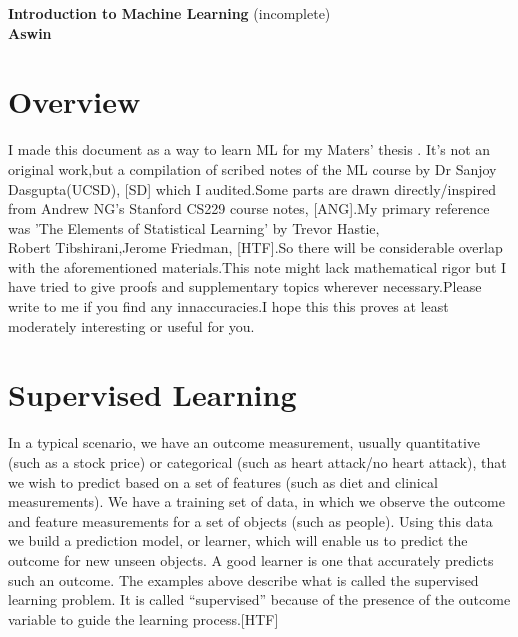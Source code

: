 \documentclass[12pt]{article}
\begin{document}
	
		\enlargethispage{2cm}
		
		\begin{center}
			
			\vspace*{-1cm}
			
			\textbf{\Large Introduction to Machine Learning     }(incomplete)\\[10pt]
			

\textbf{\Large Aswin}\\ [8pt]			
			
			\end{center}
		
\cleardoublepage

\section*{Overview}

I made this document as a way to learn ML for my Maters' thesis . It’s not an original work,but a compilation of scribed notes of the ML course by Dr Sanjoy Dasgupta(UCSD), [SD] which I audited.Some parts are drawn directly/inspired from Andrew NG's Stanford CS229 course notes, [ANG].My primary reference was 'The Elements of Statistical Learning' by Trevor Hastie,\\Robert Tibshirani,Jerome Friedman, [HTF].So there will be considerable overlap with the aforementioned materials.This note might lack mathematical rigor but I have tried to give proofs and supplementary topics wherever necessary.Please write to me if you find any innaccuracies.I hope this  this proves at least moderately
interesting or useful for you.

\cleardoublepage

\section*{Supervised Learning}

	In a typical scenario, we have an outcome measurement, usually quantitative (such as a stock price) or
categorical (such as heart attack/no heart attack), that we wish to predict
based on a set of features (such as diet and clinical measurements). We
have a training set of data, in which we observe the outcome and feature
measurements for a set of objects (such as people). Using this data we build
a prediction model, or learner, which will enable us to predict the outcome
for new unseen objects. A good learner is one that accurately predicts such
an outcome.
The examples above describe what is called the supervised learning problem. It is called “supervised” because of the presence of the outcome variable to guide the learning process.[HTF]
\end{document}
